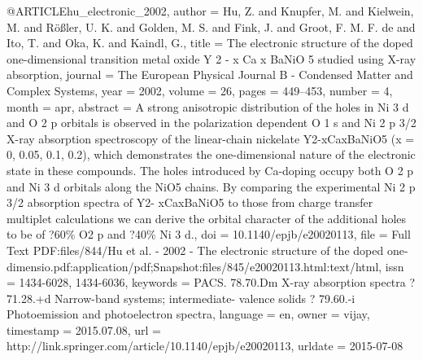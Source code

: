 @ARTICLE{hu_electronic_2002,
  author = {Hu, Z. and Knupfer, M. and Kielwein, M. and Rößler, U. K. and Golden,
	M. S. and Fink, J. and Groot, F. M. F. de and Ito, T. and Oka, K.
	and Kaindl, G.},
  title = {The electronic structure of the doped one-dimensional transition
	metal oxide {Y} 2 - x {Ca} x {BaNiO} 5 studied using {X}-ray absorption},
  journal = {The European Physical Journal B - Condensed Matter and Complex Systems},
  year = {2002},
  volume = {26},
  pages = {449--453},
  number = {4},
  month = apr,
  abstract = {A strong anisotropic distribution of the holes in Ni 3 d and O 2 p
	orbitals is observed in the polarization dependent O 1 s and Ni 2
	p 3/2 X-ray absorption spectroscopy of the linear-chain nickelate
	Y2-xCaxBaNiO5 (x = 0, 0.05, 0.1, 0.2), which demonstrates the one-dimensional
	nature of the electronic state in these compounds. The holes introduced
	by Ca-doping occupy both O 2 p and Ni 3 d orbitals along the NiO5
	chains. By comparing the experimental Ni 2 p 3/2 absorption spectra
	of Y2- xCaxBaNiO5 to those from charge transfer multiplet calculations
	we can derive the orbital character of the additional holes to be
	of ?60\% O2 p and ?40\% Ni 3 d.},
  doi = {10.1140/epjb/e20020113},
  file = {Full Text PDF:files/844/Hu et al. - 2002 - The electronic structure of the doped one-        dimensio.pdf:application/pdf;Snapshot:files/845/e20020113.html:text/html},
  issn = {1434-6028, 1434-6036},
  keywords = {PACS. 78.70.Dm X-ray absorption spectra ? 71.28.+d Narrow-band systems;
	intermediate- valence solids ? 79.60.-i Photoemission and photoelectron
	spectra},
  language = {en},
  owner = {vijay},
  timestamp = {2015.07.08},
  url = {http://link.springer.com/article/10.1140/epjb/e20020113},
  urldate = {2015-07-08}
}

